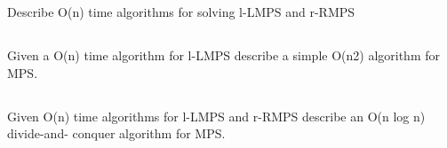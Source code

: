 \documentclass{amsart}
\theoremstyle{definition}
\theoremstyle{remark}
\numberwithin{equation}{section}
\begin{document}
\section{}

\subsection{} Describe O(n) time algorithms for solving l-LMPS and r-RMPS

\subsection{} Given a O(n) time algorithm for l-LMPS describe a simple O(n2) algorithm for MPS.

\subsection{} Given O(n) time algorithms for l-LMPS and r-RMPS describe an O(n log n) divide-and- conquer algorithm for MPS.
\end{document}
